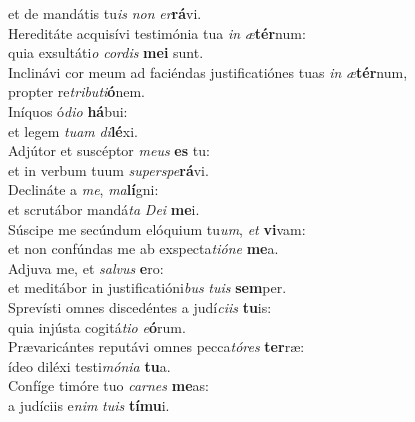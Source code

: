 \evenverse et de mandátis tu\textit{is} \textit{non} \textit{er}\textbf{rá}vi.\\
\oddverse Hereditáte acquisívi testimónia tua \textit{in} \textit{æ}\textbf{tér}num:~\*\\
\oddverse quia exsultáti\textit{o} \textit{cor}\textit{dis} \textbf{me}\textbf{i} sunt.\\
\evenverse Inclinávi cor meum ad faciéndas justificatiónes tuas \textit{in} \textit{æ}\textbf{tér}num,~\*\\
\evenverse propter re\textit{tri}\textit{bu}\textit{ti}\textbf{ó}nem.\\
\oddverse Iníquos ó\textit{di}\textit{o} \textbf{há}bui:~\*\\
\oddverse et legem \textit{tu}\textit{am} \textit{di}\textbf{lé}xi.\\
\evenverse Adjútor et suscéptor \textit{me}\textit{us} \textbf{es} tu:~\*\\
\evenverse et in verbum tuum \textit{su}\textit{per}\textit{spe}\textbf{rá}vi.\\
\oddverse Declináte a \textit{me}, \textit{ma}\textbf{lí}gni:~\*\\
\oddverse et scrutábor mandá\textit{ta} \textit{De}\textit{i} \textbf{me}i.\\
\evenverse Súscipe me secúndum elóquium tu\textit{um}, \textit{et} \textbf{vi}vam:~\*\\
\evenverse et non confúndas me ab exspecta\textit{ti}\textit{ó}\textit{ne} \textbf{me}a.\\
\oddverse Adjuva me, et \textit{sal}\textit{vus} \textbf{e}ro:~\*\\
\oddverse et meditábor in justificatióni\textit{bus} \textit{tu}\textit{is} \textbf{sem}per.\\
\evenverse Sprevísti omnes discedéntes a judí\textit{ci}\textit{is} \textbf{tu}is:~\*\\
\evenverse quia injústa cogitá\textit{ti}\textit{o} \textit{e}\textbf{ó}rum.\\
\oddverse Prævaricántes reputávi omnes pecca\textit{tó}\textit{res} \textbf{ter}ræ:~\*\\
\oddverse ídeo diléxi testi\textit{mó}\textit{ni}\textit{a} \textbf{tu}a.\\
\evenverse Confíge timóre tuo \textit{car}\textit{nes} \textbf{me}as:~\*\\
\evenverse a judíciis e\textit{nim} \textit{tu}\textit{is} \textbf{tí}\textbf{mu}i.\\
